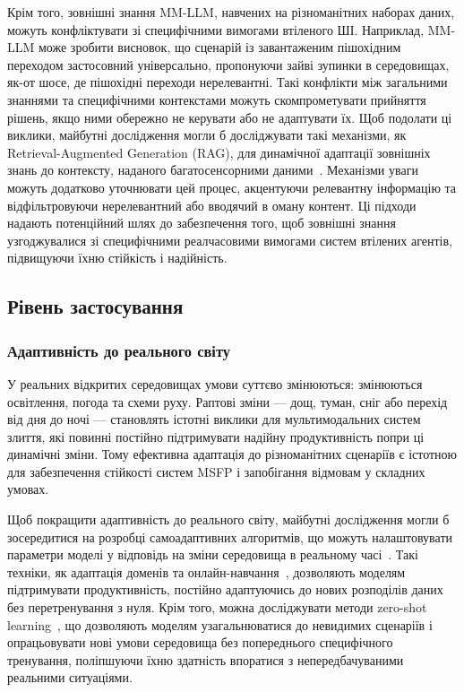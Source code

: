 Крім того, зовнішні знання MM-LLM, навчених на різноманітних наборах даних, можуть конфліктувати зі специфічними вимогами втіленого ШІ.
Наприклад, MM-LLM може зробити висновок, що сценарій із завантаженим пішохідним переходом застосовний універсально, пропонуючи зайві зупинки в середовищах, як-от шосе, де пішохідні переходи нерелевантні.
Такі конфлікти між загальними знаннями та специфічними контекстами можуть скомпрометувати прийняття рішень, якщо ними обережно не керувати або не адаптувати їх.
Щоб подолати ці виклики, майбутні дослідження могли б досліджувати такі механізми, як Retrieval-Augmented Generation (RAG), для динамічної адаптації зовнішніх знань до контексту, наданого багатосенсорними даними~\cite{sharifymoghaddam2024unirag}. Механізми уваги можуть додатково уточнювати цей процес, акцентуючи релевантну інформацію та відфільтровуючи нерелевантний або вводячий в оману контент.
Ці підходи надають потенційний шлях до забезпечення того, щоб зовнішні знання узгоджувалися зі специфічними реалчасовими вимогами систем втілених агентів, підвищуючи їхню стійкість і надійність.

\subsection{Рівень застосування}

\subsubsection{Адаптивність до реального світу}

У реальних відкритих середовищах умови суттєво змінюються: змінюються освітлення, погода та схеми руху. Раптові зміни — дощ, туман, сніг або перехід від дня до ночі — становлять істотні виклики для мультимодальних систем злиття, які повинні постійно підтримувати надійну продуктивність попри ці динамічні зміни.
Тому ефективна адаптація до різноманітних сценаріїв є істотною для забезпечення стійкості систем MSFP і запобігання відмовам у складних умовах.


Щоб покращити адаптивність до реального світу, майбутні дослідження могли б зосередитися на розробці самоадаптивних алгоритмів, що можуть налаштовувати параметри моделі у відповідь на зміни середовища в реальному часі~\cite{xing2024comprehensive}.
Такі техніки, як адаптація доменів та онлайн-навчання~\cite{silva2023adaptive, hoi2021online}, дозволяють моделям підтримувати продуктивність, постійно адаптуючись до нових розподілів даних без перетренування з нуля.
Крім того, можна досліджувати методи zero-shot learning~\cite{wang2019survey, xian2018zero}, що дозволяють моделям узагальнюватися до невидимих сценаріїв і опрацьовувати нові умови середовища без попереднього специфічного тренування, поліпшуючи їхню здатність впоратися з непередбачуваними реальними ситуаціями.



